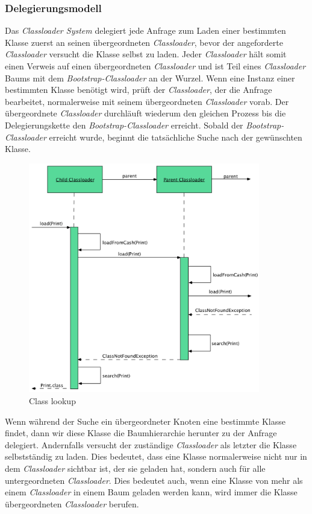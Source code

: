 \subsubsection{Delegierungsmodell}
Das \textit{Classloader System} delegiert jede Anfrage zum Laden einer bestimmten Klasse zuerst an seinen übergeordneten \textit{Classloader}, bevor der angeforderte \textit{Classloader} versucht die Klasse selbst zu laden. 
Jeder \textit{Classloader} hält somit einen Verweis auf einen übergeordneten \textit{Classloader} und ist Teil eines \textit{Classloader} Baums mit dem \textit{Bootstrap-Classloader} an der Wurzel. Wenn eine Instanz einer bestimmten Klasse benötigt wird, prüft der \textit{Classloader}, der die Anfrage bearbeitet, normalerweise mit seinem übergeordneten \textit{Classloader} vorab. Der übergeordnete \textit{Classloader} durchläuft wiederum den gleichen Prozess bis die Delegierungskette den \textit{Bootstrap-Classloader} erreicht. Sobald der \textit{Bootstrap-Classloader} erreicht wurde, beginnt die tatsächliche Suche nach der gewünschten Klasse.
\begin{figure}[h]
  \centering
  \includegraphics[width=0.9\textwidth]{material/images/flow_diagram.png}
  \caption{Class lookup}
  \label{fig:flow_diagram}
\end{figure}
Wenn während der Suche ein übergeordneter Knoten eine bestimmte Klasse findet, dann wir diese Klasse die Baumhierarchie herunter zu der Anfrage delegiert. Andernfalls versucht der zuständige \textit{Classloader} als letzter die Klasse selbstständig zu laden.
Dies bedeutet, dass eine Klasse normalerweise nicht nur in dem \textit{Classloader} sichtbar ist, der sie geladen hat, sondern auch für alle untergeordneten \textit{Classloader}. Dies bedeutet auch, wenn eine Klasse von mehr als einem \textit{Classloader} in einem Baum geladen werden kann, wird immer die Klasse übergeordneten \textit{Classloader} berufen.

